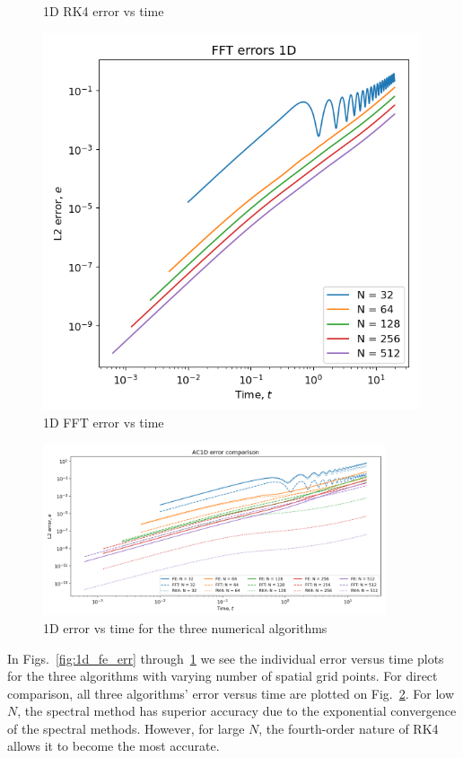 \documentclass[12pt]{article}
\begin{document}
\begin{figure}
\begin{minipage}{0.3\textwidth}
        \caption{1D RK4 error vs time}
        \label{fig:1d_rk4_err}
    \end{minipage}\hfill
    \begin{minipage}{0.3\textwidth}
        \centering
        \includegraphics[width=0.99\textwidth]{../figures/FFT_errors_1D.png}
        \caption{1D FFT error vs time}
        \label{fig:1d_fft_err}
    \end{minipage}\hfill
\end{figure}
\begin{figure}
    \centering
    \includegraphics[width=0.9\textwidth]{../figures/AC1D_error_comparison.png}
    \caption{1D error vs time for the three numerical algorithms}
    \label{fig:1d_error_comparison}
\end{figure}
In Figs.~\ref{fig:1d_fe_err} through~\ref{fig:1d_fft_err} we see the individual error versus time plots for the three algorithms with varying number of spatial grid points.
For direct comparison, all three algorithms' error versus time are plotted on Fig.~\ref{fig:1d_error_comparison}.
For low $N$, the spectral method has superior accuracy due to the exponential convergence of the spectral methods.
However, for large $N$, the fourth-order nature of RK4 allows it to become the most accurate.
\end{document}
